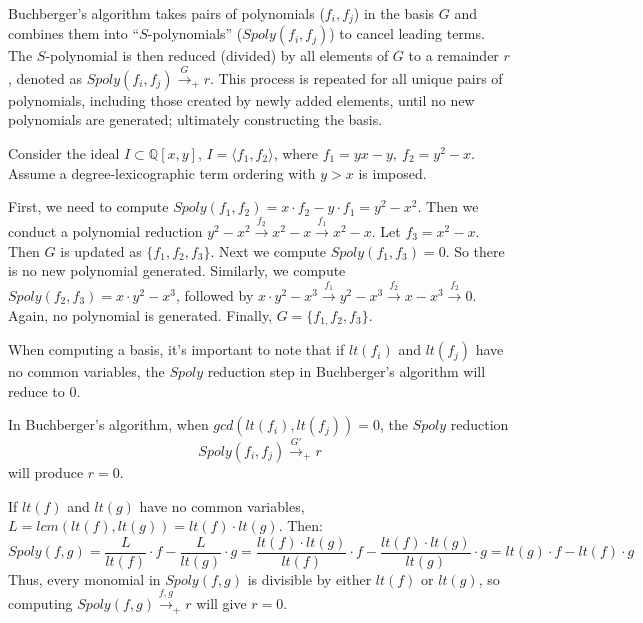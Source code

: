 Buchberger's algorithm takes pairs of polynomials ($f_{i}, f_{j}$) in 
the basis $G$ and combines them into ``$S$-polynomials'' 
($Spoly(f_{i}, f_{j})$) to cancel leading terms. The $S$-polynomial is then 
reduced (divided) by all elements of $G$ to a remainder $r$, denoted as  
$Spoly(f_{i}, f_{j}) \stackrel{G}{\textstyle\longrightarrow}_+r$. This
process is repeated for all unique pairs of polynomials, including
those created by newly added elements, until no new polynomials are
generated; ultimately constructing the \Grobner basis.
\begin{Example}\label{exp:gbsimple}
Consider the ideal $I \subset \mathbb{Q}[x, y]$, $I = \langle f_1, f_2 
\rangle$, where $f_1 = yx - y, ~f_2 = y^2 - x$. 
Assume a degree-lexicographic term ordering with $y > x$ is imposed. 

First, we need to compute $Spoly(f_{1},f_{2})=x\cdot f_{2}-y\cdot f_{1}=y^{2}-x^{2}$.
Then we conduct a polynomial reduction 
$y^{2}-x^{2}\stackrel{f_{2}}{\textstyle\longrightarrow}x^{2}-x \stackrel{f_{1}}{\textstyle\longrightarrow}x^{2}-x$.
Let $f_{3}=x^{2}-x$. Then $G$ is updated as $\{f_{1},f_{2},f_{3}\}$. Next we compute $Spoly(f_{1},f_{3})=0$. So there
is no new polynomial generated. Similarly, we compute $Spoly(f_{2},f_{3})=x\cdot y^{2}-x^{3}$, followed by 
$x\cdot y^{2}-x^{3}\stackrel{f_{1}}{\textstyle\longrightarrow}y^{2}-x^{3} \stackrel{f_{2}}{\textstyle\longrightarrow}x-x^{3}
\stackrel{f_{2}}{\textstyle\longrightarrow}0$. Again, no polynomial is generated. Finally, $G=\{f_{1,}f_{2},f_{3}\}$.

\end{Example}

When computing a \Grobner basis, it's important to note that if $lt(f_i)$ 
and $lt(f_j)$ have no common variables, the $Spoly$ reduction step in 
Buchberger's algorithm will reduce to 0.
\begin{Lemma}
In Buchberger's algorithm, when $gcd(lt(f_i),lt(f_j)) = 0$, the $Spoly$ reduction
$$Spoly(f_{i}, f_{j}) \stackrel{G'}{\textstyle\longrightarrow}_+r$$
will produce $r=0$.
\end{Lemma}

\begin{Proof}
If $lt(f)$ and $lt(g)$ have no common variables,  
$L=lcm(lt(f),lt(g))=lt(f)\cdot lt(g)$. Then: 
\begin{equation}
    Spoly(f,g)=\frac{L}{lt(f)}\cdot f - \frac{L}{lt(g)}\cdot g=
\frac{lt(f)\cdot lt(g)}{lt(f)}\cdot f - \frac{lt(f)\cdot lt(g)}{lt(g)}\cdot g
= lt(g)\cdot f - lt(f)\cdot g \nonumber
\end{equation}
Thus, every monomial in $Spoly(f, g)$ is divisible by either $lt(f)$ 
or $lt(g)$, so computing 
$Spoly(f, g) \stackrel{f,g}{\textstyle\longrightarrow}_+r$ will give $r=0$.
\end{Proof}

